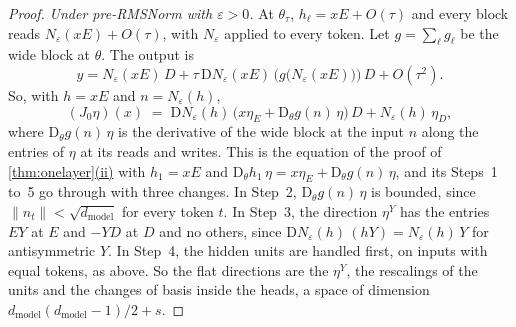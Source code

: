 \documentclass[10pt]{article}
\theoremstyle{definition}
\theoremstyle{remark}
\newcommand{\dm}{d_{\mathrm{model}}}
\newcommand{\Der}{\mathrm{D}}
\newcommand{\norm}[1]{\lVert #1\rVert}
\DeclareRobustCommand{\cpref}[2]{\hyperref[#1:#2]{\cref*{#1}(#2)}}
\begin{document}
\begin{proof}
\emph{Under pre-RMSNorm with $\varepsilon > 0$.} At $\theta_\tau$, $h_\ell = xE + O(\tau)$ and every block reads $N_\varepsilon(xE) + O(\tau)$, with $N_\varepsilon$ applied to every token. Let $g = \sum_\ell g_\ell$ be the wide block at $\theta$. The output is
\[
y = N_\varepsilon(xE)\,D + \tau\,\Der N_\varepsilon(xE)\,\Big(g\big(N_\varepsilon(xE)\big)\Big)\,D + O(\tau^2).
\]
So, with $h = xE$ and $n = N_\varepsilon(h)$,
\[
(J_0\eta)(x) \;=\; \Der N_\varepsilon(h)\,\big(x\eta_E + \Der_\theta g(n)\,\eta\big)\,D + N_\varepsilon(h)\,\eta_D ,
\]
where $\Der_\theta g(n)\,\eta$ is the derivative of the wide block at the input $n$ along the entries of $\eta$ at its reads and writes. This is the equation of the proof of \cpref{thm:onelayer}{ii} with $h_1 = xE$ and $\Der_\theta h_1\,\eta = x\eta_E + \Der_\theta g(n)\,\eta$, and its Steps~1 to~5 go through with three changes. In Step~2, $\Der_\theta g(n)\,\eta$ is bounded, since $\norm{n_t} < \sqrt{\dm}$ for every token $t$. In Step~3, the direction $\eta^Y$ has the entries $EY$ at $E$ and $-YD$ at $D$ and no others, since $\Der N_\varepsilon(h)\,(hY) = N_\varepsilon(h)\,Y$ for antisymmetric $Y$. In Step~4, the hidden units are handled first, on inputs with equal tokens, as above. So the flat directions are the $\eta^Y$, the rescalings of the units and the changes of basis inside the heads, a space of dimension $\dm(\dm-1)/2 + s$.


\end{proof}
\end{document}
